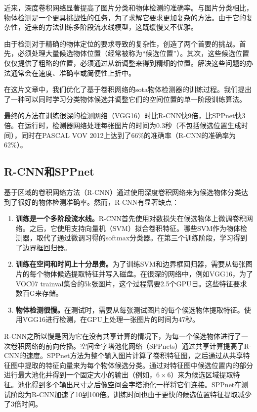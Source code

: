 \documentclass[../main]{subfile}
\begin{document}
近来，深度卷积网络显著提高了图片分类和物体检测的准确率。与图片分类相比，物体检测是一个更具挑战性的任务，为了求解它要求更加复杂的方法。由于它的复杂性，近来的方法训练多阶段流水线模型，这既缓慢又不优雅。

由于检测对于精确的物体定位的要求导致的复杂性，创造了两个首要的挑战。首先，必须处理大量候选物体位置（经常被称为“候选位置”）。其次，这些候选位置仅仅提供了粗略的位置，必须通过从新调整来得到精细的位置。解决这些问题的办法通常会在速度、准确率或简便性上折中。

在这片文章中，我们优化了基于卷积网络的sota物体检测器的训练过程。我们提出了一种可以同时学习分类物体候选并调整它们的空间位置的单一阶段训练算法。

最终的方法在训练很深的检测网络（VGG16\cite{vgg}）时比R-CNN\cite{rcnn}快9倍，比SPPnet\cite{spp}快3倍。在运行时，检测器网络处理每张图片的时间为0.3秒（不包括候选位置生成时间），同时在PASCAL VOV 2012上达到了66\%的准确率（R-CNN的准确率为62\%）。

\subsection{R-CNN和SPPnet}

基于区域的卷积网络方法（R-CNN）\cite{rcnn}通过使用深度卷积网络来为候选物体分类达到了很好的物体检测准确率。然而，R-CNN有显著缺点：
\begin{enumerate}
    \item \textbf{训练是一个多阶段流水线。}R-CNN首先使用对数损失在候选物体上微调卷积网络。之后，它使用支持向量机（SVM）拟合卷积特征。哪些SVM作为物体检测器，取代了通过微调习得的softmax分类器。在第三个训练阶段，学习得到了边界框回归器。
    \item \textbf{训练在空间和时间上十分昂贵。}为了训练SVM和边界框回归器，需要从每张图片的每个物体候选提取特征并写入磁盘。在很深的网络中，例如VGG16，为了VOC07 trainval集合的5k张图片，这个过程需要2.5个GPU日。这些特征要求数百G来存储。
    \item \textbf{物体检测很慢。}在测试时，需要从每张测试图片的每个候选物体提取特征。使用VGG16进行检测，在GPU上处理一张图片的时间为47秒。
\end{enumerate}

R-CNN之所以慢是因为它在没有共享计算的情况下，为每一个候选物体进行了一次卷积网络的前向传播。空间金字塔池化网络（SPPnets）\cite{spp}通过共享计算提高了R-CNN的速度。SPPnet方法为整个输入图片计算了卷积特征图，之后通过从共享特征图中提取的特征向量来为每个物体候选分类。通过对特征图中候选位置内的部分进行最大池化并得到一个固定大小的输出（例如，$6\times 6$）来为候选区域提取特征。池化得到多个输出尺寸之后像空间金字塔池化\cite{sp}一样将它们连接。SPPnet在测试阶段为R-CNN加速了10到100倍。训练时间也由于更快的候选位置特征提取减少了3倍时间。
\end{document}
